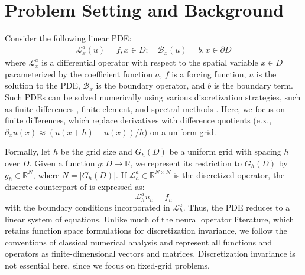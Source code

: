 \documentclass{article} %
\begin{document}
\section{Problem Setting and Background} \label{sec:background}

Consider the following linear PDE:
\begin{equation} \label{eq:mainpde}
    \begin{split}
    \mathcal{L}_{x}^a\left(u\right) = f ,x \in D; \quad
    \mathcal{B}_{x}\left(u\right) = b ,x \in \partial D
    \end{split}
\end{equation}
where $\mathcal{L}_x^a$ is a differential operator with respect to the spatial variable $x \in D$ parameterized by the coefficient function $a$,  $f$ is a forcing function,  $u$ is the solution to the PDE, $\mathcal{B}_{x}$ is the boundary operator, and $b$ is the boundary term. Such PDEs can be solved numerically using various discretization strategies, such as finite differences \citep{smith1985numerical,leveque2007finite}, finite element, and spectral methods \citep{boyd2001chebyshev,canuto2006spectral}. Here, we focus on finite differences, which replace derivatives with difference quotients (e.x., $\partial_x u(x) \approx (u(x + h) - u(x))/h$) on a uniform grid.

Formally, let $h$ be the grid size and $G_h(D)$ be a uniform grid with spacing $h$ over $D$. Given a function $g: D \to \mathbb{R}$, we represent its restriction to $G_h(D)$ by $g_h \in \mathbb{R}^N$,
where $N = |G_h(D)|$. If $\mathcal{L}_h^a \in \mathbb{R}^{N \times N}$ is the discretized operator, the discrete counterpart of  is expressed as:
\begin{equation} \label{eq:mainpdediscrete}
    \mathcal{L}_h^au_h = f_h
\end{equation}
with the boundary conditions incorporated in $\mathcal{L}_h^a$. Thus, the PDE reduces to a linear system of equations. Unlike much of the neural operator literature, which retains function space formulations for discretization invariance, we follow the conventions of classical numerical analysis and represent all functions and operators as finite-dimensional vectors and matrices. Discretization invariance is not essential here, since we focus on fixed-grid problems.
\end{document}
